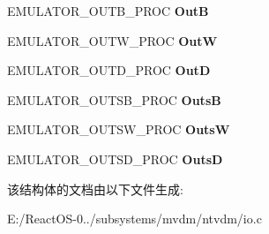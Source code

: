\begin{DoxyCompactItemize}
\item 
\mbox{\label{struct___e_m_u_l_a_t_o_r___i_o___h_a_n_d_l_e_r_s_a781434b14ac599915d69e3400160e8e7}} 
E\+M\+U\+L\+A\+T\+O\+R\+\_\+\+O\+U\+T\+B\+\_\+\+P\+R\+OC {\bfseries OutB}
\item 
\mbox{\label{struct___e_m_u_l_a_t_o_r___i_o___h_a_n_d_l_e_r_s_a35f3daf0f8943235fd152736d47d7f4b}} 
E\+M\+U\+L\+A\+T\+O\+R\+\_\+\+O\+U\+T\+W\+\_\+\+P\+R\+OC {\bfseries OutW}
\item 
\mbox{\label{struct___e_m_u_l_a_t_o_r___i_o___h_a_n_d_l_e_r_s_a651deca9f2e359eee99b6f80432c04e6}} 
E\+M\+U\+L\+A\+T\+O\+R\+\_\+\+O\+U\+T\+D\+\_\+\+P\+R\+OC {\bfseries OutD}
\item 
\mbox{\label{struct___e_m_u_l_a_t_o_r___i_o___h_a_n_d_l_e_r_s_ae454f47d07a0f75200f8ce70b65dff4e}} 
E\+M\+U\+L\+A\+T\+O\+R\+\_\+\+O\+U\+T\+S\+B\+\_\+\+P\+R\+OC {\bfseries OutsB}
\item 
\mbox{\label{struct___e_m_u_l_a_t_o_r___i_o___h_a_n_d_l_e_r_s_ad4e9f9d2ddd77c0ec3829b4c4b57bd8f}} 
E\+M\+U\+L\+A\+T\+O\+R\+\_\+\+O\+U\+T\+S\+W\+\_\+\+P\+R\+OC {\bfseries OutsW}
\item 
\mbox{\label{struct___e_m_u_l_a_t_o_r___i_o___h_a_n_d_l_e_r_s_a73490590cef7822bd8d530418965d237}} 
E\+M\+U\+L\+A\+T\+O\+R\+\_\+\+O\+U\+T\+S\+D\+\_\+\+P\+R\+OC {\bfseries OutsD}
\end{DoxyCompactItemize}


该结构体的文档由以下文件生成\+:\begin{DoxyCompactItemize}
\item 
E\+:/\+React\+O\+S-\/0../subsystems/mvdm/ntvdm/io.\+c\end{DoxyCompactItemize}
